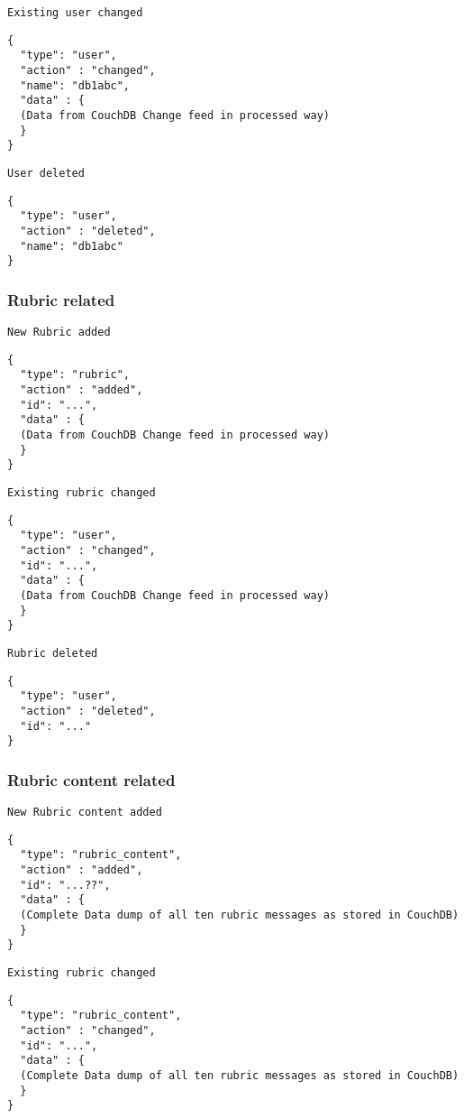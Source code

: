 \texttt{Existing user changed}
\begin{lstlisting}
{
  "type": "user",
  "action" : "changed",
  "name": "db1abc",
  "data" : {
  (Data from CouchDB Change feed in processed way)
  }
}
\end{lstlisting}

\texttt{User deleted}
\begin{lstlisting}
{
  "type": "user",
  "action" : "deleted",
  "name": "db1abc"
}
\end{lstlisting}


\subsubsection{Rubric related}
\texttt{New Rubric added}
\begin{lstlisting}
{
  "type": "rubric",
  "action" : "added",
  "id": "...",
  "data" : {
  (Data from CouchDB Change feed in processed way)
  }
}
\end{lstlisting}

\texttt{Existing rubric changed}
\begin{lstlisting}
{
  "type": "user",
  "action" : "changed",
  "id": "...",
  "data" : {
  (Data from CouchDB Change feed in processed way)
  }
}
\end{lstlisting}

\texttt{Rubric deleted}
\begin{lstlisting}
{
  "type": "user",
  "action" : "deleted",
  "id": "..."
}
\end{lstlisting}

\subsubsection{Rubric content related}

\texttt{New Rubric content added}
\begin{lstlisting}
{
  "type": "rubric_content",
  "action" : "added",
  "id": "...??",
  "data" : {
  (Complete Data dump of all ten rubric messages as stored in CouchDB)
  }
}
\end{lstlisting}

\texttt{Existing rubric changed}
\begin{lstlisting}
{
  "type": "rubric_content",
  "action" : "changed",
  "id": "...",
  "data" : {
  (Complete Data dump of all ten rubric messages as stored in CouchDB)
  }
}
\end{lstlisting}

